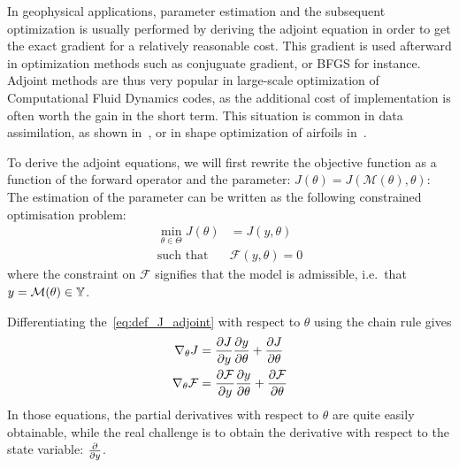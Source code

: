 \documentclass[../../Main_ManuscritThese.tex]{subfiles}
\begin{document}
In geophysical applications, parameter estimation and the subsequent optimization is usually performed by deriving the adjoint equation in order to get the exact gradient for a relatively reasonable cost. This gradient is used afterward in optimization methods such as conjuguate gradient, or BFGS for instance. Adjoint methods are thus very popular in large-scale optimization of Computational Fluid Dynamics codes, as the additional cost of implementation is often worth the gain in the short term. This situation is common in data assimilation, as shown in~\cite{das_estimation_1991,das_variational_1992,honnorat_identification_2010,couderc_dassfow-shallow_2013}, or in shape optimization of airfoils in~\cite{huyse_free-form_2001}.

To derive the adjoint equations, we will first rewrite the objective function as a function of the forward operator and the parameter: $J(\theta) = J(\mathcal{M}(\theta),\theta)$:
The estimation of the parameter can be written as the following constrained optimisation problem:
\begin{equation}
  \begin{aligned}
  \min_{\theta \in \Theta} J(\theta) &= J(y, \theta) \label{eq:def_J_adjoint} \\
  \text{such that } &\mathcal{F}(y, \theta) = 0 %
  \end{aligned}
\end{equation}
where the constraint on $\mathcal{F}$ signifies that the model is admissible, i.e.\ that $y = \mathcal{M}(\theta)\in \mathbb{Y}$.

 Differentiating the~\cref{eq:def_J_adjoint} with respect to $\theta$ using the chain rule gives
\begin{equation}
  \begin{aligned}
  \nabla_\theta J &= \frac{\partial J}{\partial y} \frac{\partial y}{\partial \theta} + \frac{\partial J}{\partial \theta}\\
    \nabla_\theta \mathcal{F} &= \frac{\partial \mathcal{F}}{\partial y} \frac{\partial y}{\partial \theta} + \frac{\partial \mathcal{F}}{\partial \theta}
  \end{aligned} \label{eq:aze}
\end{equation}
In those equations, the partial derivatives with respect to $\theta$ are quite easily obtainable, while the real challenge is to obtain the derivative with respect to the state variable: $\frac{\partial }{\partial y}$.
\end{document}
